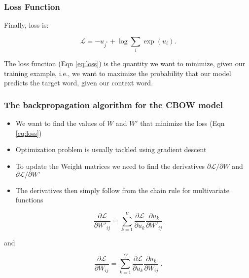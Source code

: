 \begin{frame}[fragile]\frametitle{Loss Function}
Finally, loss is:

\begin{equation}
\mathcal{L} = -u_{j^*} + \log \sum_i \exp{(u_i)}.
\label{eq:loss}
\end{equation}

The loss function (Eqn \ref{eq:loss}) is the quantity we want to minimize, given our training example, i.e., we want to maximize the probability that our model predicts the target word, given our context word.

\end{frame}

\begin{frame}[fragile]\frametitle{The backpropagation algorithm for the CBOW model}
  \begin{itemize}
    \item We want to find the values of $W$ and $W'$ that minimize the loss (Eqn \ref{eq:loss})
	\item Optimization problem is usually tackled using gradient descent
	\item To update the Weight matrices we need to find the derivatives  $\partial \mathcal{L}/\partial{W}$ and $\partial \mathcal{L}/\partial{W’}$
	\item The derivatives then simply follow from the chain rule for multivariate functions
	



  \end{itemize}

	\begin{equation}
\frac{\partial\mathcal{L}}{\partial W'_{ij}} = \sum_{k=1}^V\frac{\partial\mathcal{L}}{\partial u_k}\frac{\partial u_k}{\partial W'_{ij}}
\label{eq:dLdWp}
\end{equation}

and

\begin{equation}
\frac{\partial\mathcal{L}}{\partial W_{ij}} = \sum_{k=1}^V\frac{\partial\mathcal{L}}{\partial u_k}\frac{\partial u_k}{\partial W_{ij}}\ .
\label{eq:dLdW}
\end{equation}


\end{frame}


